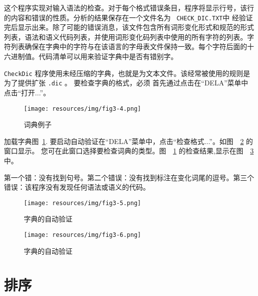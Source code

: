 \bigskip
\noindent 这个程序实现对输入语法的检查。对于每个格式错误条目，程序将显示行号，该行的内容和错误的性质。分析的结果保存在一个文件名为
\ \verb+CHECK_DIC.TXT+中 经验证完后显示出来。除了可能的错误消息，该文件包含所有词形变化形式和规范的形式列表，语法和语义代码列表，并使用词形变化码列表中使用的所有字符的列表。字符列表确保在字典中的字符与在该语言的字母表文件保持一致。每个字符后面的十六进制值。代码清单可以用来验证字典中是否有错别字。


\bigskip
\noindent  \verb+CheckDic+ 程序使用未经压缩的字典，也就是为文本文件。该经常被使用的规则是为了提供扩张
\verb+.dic+ 。 要检查字典的格式，必须
首先通过点击在“DELA”菜单中点击“打开...”。

\begin{figure}[h]
\begin{center}
\texttt{[image: resources/img/fig3-4.png]}
\caption{词典例子\label{fig-dictionary-example}}
\end{center}
\end{figure}

\noindent 加载字典图~\ref{fig-dictionary-example}.
要启动自动验证在“DELA”菜单中，点击“检查格式...”。如图\ ~\ref{fig-dictionary-checking} 的窗口显示。
您可在此窗口选择要检查词典的类型。图\ ~\ref{fig-dictionary-example} 的检查结果,显示在图\ ~\ref{fig-dictionary-checking-results} 中。

\bigskip
\noindent 第一个错：没有找到句号。第二个错误：没有找到标注在变化词尾的逗号。第三个错误：该程序没有发现任何语法或语义的代码。




\begin{figure}[!h]
\begin{center}
\texttt{[image: resources/img/fig3-5.png]}
\caption{字典的自动验证\label{fig-dictionary-checking}}
\end{center}
\end{figure}

\begin{figure}[!p]
\begin{center}
\texttt{[image: resources/img/fig3-6.png]}
\caption{字典的自动验证\ \label{fig-dictionary-checking-results}}
\end{center}
\end{figure}


\section{排序}

